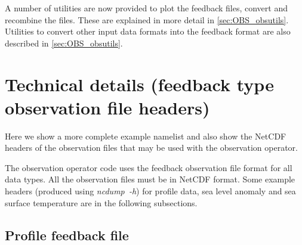 \documentclass[../main/NEMO_manual]{subfiles}
\begin{document}
A number of utilities are now provided to plot the feedback files, convert and recombine the files.
These are explained in more detail in \autoref{sec:OBS_obsutils}.
Utilities to convert other input data formats into the feedback format are also described in
\autoref{sec:OBS_obsutils}.

\section{Technical details (feedback type observation file headers)}
\label{sec:OBS_details}

Here we show a more complete example namelist  and also show the NetCDF headers of
the observation files that may be used with the observation operator.

\begin{listing}
  \caption{}
  \label{lst:namobs}
\end{listing}

The observation operator code uses the feedback observation file format for all data types.
All the observation files must be in NetCDF format.
Some example headers (produced using \mbox{\textit{ncdump~-h}}) for profile data, sea level anomaly and
sea surface temperature are in the following subsections.

\subsection{Profile feedback file}
\end{document}
